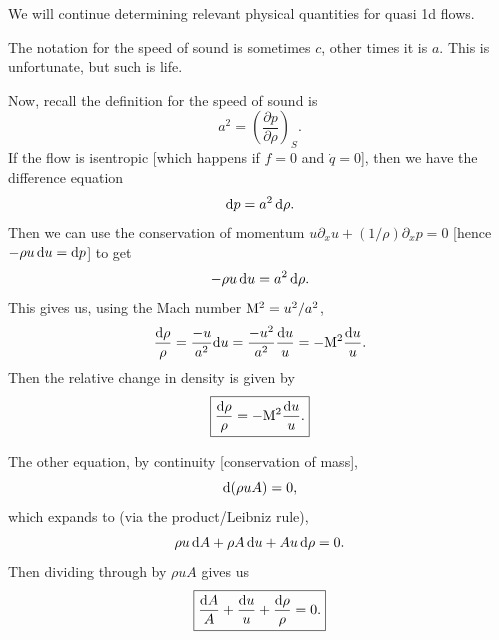 
\lecture{}

We will continue determining relevant physical quantities for quasi 1d flows.

\begin{notation}
The notation for the speed of sound is sometimes $c$, other times it
is $a$. This is unfortunate, but such is life.
\end{notation}

\begin{node}
Now, recall the definition for the speed of sound is
\begin{equation}
a^{2} = \left(\frac{\partial p}{\partial\rho}\right)_{S}.
\end{equation}
If the flow is isentropic [which happens if $f=0$ and $\dot{q}=0$],
then we have the difference equation 
\begin{equation}
\mathrm{d} p = a^{2}\,\mathrm{d}\rho.
\end{equation}
Then we can use the conservation of momentum $u\partial_{x}u+(1/\rho)\partial_{x}p=0$
[hence $-\rho u\,\mathrm{d} u =\mathrm{d} p$] to get
\begin{equation}
-\rho u\,\mathrm{d} u = a^{2}\,\mathrm{d}\rho.
\end{equation}
This gives us, using the Mach number $\mathrm{M}^{2}=u^{2}/a^{2}$,
\begin{equation}
\frac{\mathrm{d}\rho}{\rho}=\frac{-u}{a^{2}}\mathrm{d} u =\frac{-u^{2}}{a^{2}}\frac{\mathrm{d} u}{u}=-\mathrm{M}^{2}\frac{\mathrm{d} u}{u}.
\end{equation}
Then the relative change in density is given by
\begin{equation}\label{eq:fall:lec19:me101a:eq1}
\boxed{\frac{\mathrm{d}\rho}{\rho}=-\mathrm{M}^{2}\frac{\mathrm{d} u}{u}.}
\end{equation}
\end{node}

\begin{node}
The other equation, by continuity [conservation of mass],
\begin{equation}
\mathrm{d}(\rho u A)=0,
\end{equation}
which expands to (via the product/Leibniz rule),
\begin{equation}
\rho u\,\mathrm{d} A + \rho A\,\mathrm{d} u + Au\,\mathrm{d}\rho=0.
\end{equation}
Then dividing through by $\rho u A$ gives us
\begin{equation}\label{eq:fall:lec19:me101a:eq2}
\boxed{\frac{\mathrm{d} A}{A} + \frac{\mathrm{d} u}{u} + \frac{\mathrm{d}\rho}{\rho}=0.}
\end{equation}
\end{node}

